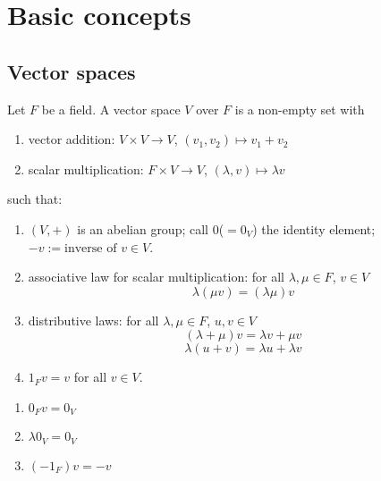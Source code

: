 \documentclass{scrartcl}
\begin{document}
\section{Basic concepts}
\subsection{Vector spaces}
\begin{definition}
	Let $F$ be a field. A vector space $V$ over $F$ is a non-empty set with
	\begin{enumerate}
		\item vector addition: $V \times V \to V$, $(v_1, v_2) \mapsto v_1+v_2$
		\item scalar multiplication: $F \times V \to V$, $(\lambda, v) \mapsto \lambda v$
	\end{enumerate}
	such that: 
	\begin{enumerate}
		\item $(V, +)$ is an abelian group; call $0$($=0_V$) the identity element; $-v := \text{inverse of } v \in V$.
		\item associative law for scalar multiplication: for all $\lambda, \mu \in F$, $v \in V$
			\[\lambda(\mu v) = (\lambda\mu)v\]
		\item distributive laws: for all $\lambda, \mu \in F$, $u, v \in V$
			\[(\lambda+\mu)v = \lambda v + \mu v\]
			\[\lambda(u+v) = \lambda u + \lambda v\]
		\item $1_F v = v$ for all $v \in V$.
	\end{enumerate}
\end{definition}
\begin{lemma}
	\begin{enumerate}
		\item $0_Fv = 0_V$
		\item $\lambda 0_V = 0_V$
		\item $(-1_F)v = -v$
	\end{enumerate}
\end{lemma}
\iffalse
\begin{proof}
	\begin{enumerate}
		\item We have
		\begin{align*}
			0_F + 0_F = 0_F &\implies (0_F + 0_F)v = 0_F v \\
			&\implies 0_F v + 0_F v = 0_F v \\
			&\implies 0_F v + 0_F v - 0_F v = 0_F v - 0_F v\\
			&\implies 0_F v = 0_V.
		\end{align*}
		\item 
	\end{enumerate}
\end{proof}
\fi
\end{document}
